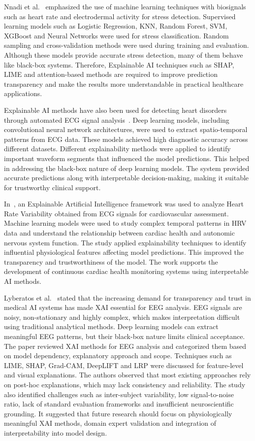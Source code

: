 \documentclass[12pt,a4paper]{report}
\begin{document}
Nnadi et al.~\cite{b6} emphasized the use of machine learning techniques with biosignals such as heart rate and electrodermal activity for stress detection. Supervised learning models such as Logistic Regression, KNN, Random Forest, SVM, XGBoost and Neural Networks were used for stress classification. Random sampling and cross-validation methods were used during training and evaluation. Although these models provide accurate stress detection, many of them behave like black-box systems. Therefore, Explainable AI techniques such as SHAP, LIME and attention-based methods are required to improve prediction transparency and make the results more understandable in practical healthcare applications.

Explainable AI methods have also been used for detecting heart disorders through automated ECG signal analysis~\cite{b7}. Deep learning models, including convolutional neural network architectures, were used to extract spatio-temporal patterns from ECG data. These models achieved high diagnostic accuracy across different datasets. Different explainability methods were applied to identify important waveform segments that influenced the model predictions. This helped in addressing the black-box nature of deep learning models. The system provided accurate predictions along with interpretable decision-making, making it suitable for trustworthy clinical support.

In~\cite{b8}, an Explainable Artificial Intelligence framework was used to analyze Heart Rate Variability obtained from ECG signals for cardiovascular assessment. Machine learning models were used to study complex temporal patterns in HRV data and understand the relationship between cardiac health and autonomic nervous system function. The study applied explainability techniques to identify influential physiological features affecting model predictions. This improved the transparency and trustworthiness of the model. The work supports the development of continuous cardiac health monitoring systems using interpretable AI methods.

Lyberatos et al.~\cite{b9} stated that the increasing demand for transparency and trust in medical AI systems has made XAI essential for EEG analysis. EEG signals are noisy, non-stationary and highly complex, which makes interpretation difficult using traditional analytical methods. Deep learning models can extract meaningful EEG patterns, but their black-box nature limits clinical acceptance. The paper reviewed XAI methods for EEG analysis and categorized them based on model dependency, explanatory approach and scope. Techniques such as LIME, SHAP, Grad-CAM, DeepLIFT and LRP were discussed for feature-level and visual explanations. The authors observed that most existing approaches rely on post-hoc explanations, which may lack consistency and reliability. The study also identified challenges such as inter-subject variability, low signal-to-noise ratio, lack of standard evaluation frameworks and insufficient neuroscientific grounding. It suggested that future research should focus on physiologically meaningful XAI methods, domain expert validation and integration of interpretability into model design.
\end{document}
